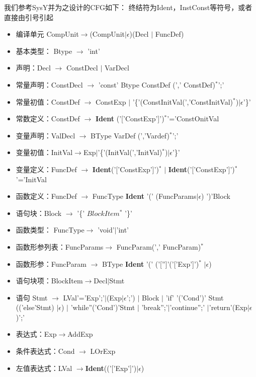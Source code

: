 \documentclass[UTF8]{ctexart}
\begin{document}
    我们参考SysY并为之设计的CFG如下：
    终结符为Ident，InstConst等符号，或者直接由引号引起
    \begin{itemize}
        \item 编译单元 CompUnit$\rightarrow$(CompUnit$\mid \epsilon$)(Decl $\mid$ FuncDef)
        \item 基本类型： Btype $\rightarrow$ 'int'
        \item 声明：Decl $\rightarrow$ ConstDecl $\mid$ VarDecl
        \item 常量声明：ConstDecl  $\rightarrow$ 'const' Btype ConstDef (',' ConstDef)$^*$';'
        \item 常量初值：ConstDef $\rightarrow$ ConstExp $\mid$ '\{'(ConstInitVal(','ConstInitVal)$^*$)$\mid \epsilon$'\}'
        \item 常数定义：ConstDef $\rightarrow$ {\bf{Ident}} ('['ConstExp']')$^*$'='ConstOnitVal
        \item 变量声明：ValDecl $\rightarrow$ BType VarDef (','Vardef)$^*$';'
        \item 变量初值：InitVal$\rightarrow$Exp$\mid$'\{'(InitVal(','InitVal)$^*$)$\mid \epsilon$'\}'
        \item 变量定义：FuncDef $\rightarrow$ {\bf{Ident}}('['ConstExp']')$^*$ $\mid$ {\bf{Ident}}('['ConstExp']')$^*$'='InitVal
        \item 函数定义：FuncDef  $\rightarrow$ FuncType {\bf{Ident}} '(' (FuncParams$\mid \epsilon$) ')'Block
        \item 语句块：Block $\rightarrow$ '\{'  $BlockItem^{*}$ '\}'
        \item 函数类型： FuncType$\rightarrow$ 'void'$\mid$'int'
        \item 函数形参列表：FuncParams$\rightarrow$ FuncParam(',' FuncParam)$^*$
        \item 函数形参：FuncParam $\rightarrow$ BType {\bf{Ident}} '(' ('['']'('['Exp']')$^*$ $\mid \epsilon$)
        \item 语句块项：BlockItem$\rightarrow$Decl$\mid$Stmt
        \item 语句
         Stmt $\rightarrow$ LVal'='Exp';'$\mid$(Exp$\mid \epsilon$';') $\mid$ Block $\mid$ 
        'if' '('Cond')' Stmt (('else'Stmt) $\mid \epsilon$) $\mid$ 'while''('Cond')'Stmt $\mid$ 'break'';'$\mid$'continue'';'
        $\mid$'return'(Exp$\mid \epsilon$)';'
        \item 表达式：Exp$\rightarrow$AddExp
        \item 条件表达式：Cond $\rightarrow$ LOrExp
        \item 左值表达式：LVal $\rightarrow${\bf{Ident}}(('['Exp']')$\mid \epsilon$)

\end{itemize}
\end{document}
